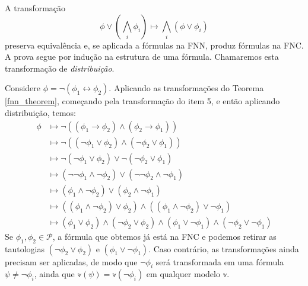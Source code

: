 \begin{theorem}
    A transformação $$\phi \vee \left( \bigwedge_i \phi_i \right) \longmapsto \bigwedge_i \left( \phi \vee \phi_i \right)$$ preserva equivalência e, se aplicada a fórmulas na FNN, produz fórmulas na FNC. A prova segue por indução na estrutura de uma fórmula. Chamaremos esta transformação de \emph{distribuição}.
\end{theorem}

\begin{example}
    Considere $\phi = \neg(\phi_1 \leftrightarrow \phi_2)$. Aplicando as transformações do Teorema \ref{fnn_theorem}, começando pela transformação do item 5, e então aplicando distribuição, temos:
    \begin{equation*}
        \begin{split}
            \phi & \longmapsto \neg((\phi_1 \rightarrow \phi_2) \wedge (\phi_2 \rightarrow \phi_1)) \\
                 & \longmapsto \neg((\neg \phi_1 \vee \phi_2) \wedge (\neg \phi_2 \vee \phi_1)) \\
                 & \longmapsto \neg(\neg \phi_1 \vee \phi_2) \vee \neg(\neg \phi_2 \vee \phi_1) \\
                 & \longmapsto (\neg \neg \phi_1 \wedge \neg \phi_2) \vee (\neg \neg \phi_2 \wedge \neg \phi_1) \\
                 & \longmapsto (\phi_1 \wedge \neg \phi_2) \vee (\phi_2 \wedge \neg \phi_1) \\
                 & \longmapsto ((\phi_1 \wedge \neg \phi_2) \vee \phi_2) \wedge ((\phi_1 \wedge \neg \phi_2) \vee \neg \phi_1) \\
                 & \longmapsto (\phi_1 \vee \phi_2) \wedge (\neg \phi_2 \vee \phi_2) \wedge (\phi_1 \vee \neg \phi_1) \wedge (\neg \phi_2 \vee \neg \phi_1)
        \end{split}
    \end{equation*}
    Se $\phi_1,\phi_2 \in \mathcal{P}$, a fórmula que obtemos já está na FNC e podemos retirar as tautologias $(\neg \phi_2 \vee \phi_2)$ e $(\phi_1 \vee \neg \phi_1)$. Caso contrário, as transformações ainda precisam ser aplicadas, de modo que $\neg \phi_i$ será transformada em uma fórmula $\psi \neq \neg \phi_i$, ainda que $\mathbb{v}(\psi) = \mathbb{v}(\neg \phi_i)$ em qualquer modelo $\mathbb{v}$.
    

\end{example}
